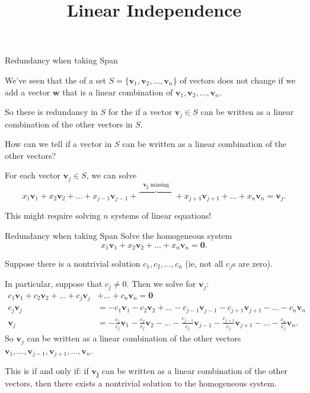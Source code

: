 \documentclass[xcolor=dvipsnames,aspectratio=169,t]{beamer}
\title{Linear Independence}
\begin{document}
\maketitle

\begin{frame}{Redundancy when taking Span}

  We've seen that the  of a set $S=\{\mathbf{v}_1,\mathbf{v}_2,\dots,\mathbf{v}_n\}$ of vectors does not change if we add a vector $\mathbf{w}$ that is a linear combination of $\mathbf{v}_1,\mathbf{v}_2,\dots,\mathbf{v}_n$.
  \bigskip
  
  So there is redundancy in $S$ for the  if a vector $\mathbf{v}_j\in S$ can be written as a linear combination of the other vectors in $S$.
  \bigskip
  
  How can we tell if a vector in $S$ can be written as a linear combination of the other vectors?
  \bigskip
  \pause
  
  For \alert{each} vector $\mathbf{v}_j\in S$, we can solve
  \[
    x_1 \mathbf{v}_1 + x_2 \mathbf{v}_2 + \dots 
    + x_{j-1} \mathbf{v}_{j-1}
    + \overbrace{\phantom{x_{j-1} \mathbf{v}_{j-1}}}^{\text{$\mathbf{v_j}$ missing}}
    + x_{j+1} \mathbf{v}_{j+1} + \dots +x_n \mathbf{v}_n = \mathbf{v}_j.
  \]
  \pause
  
  \hfill This might require solving \alert{$n$ systems} of linear equations!
  
\end{frame}
  
\begin{frame}{Redundancy when taking Span}
  \textbf{}
  Solve the homogeneous system
  \[
    x_1 \mathbf{v}_1 + x_2 \mathbf{v}_2 + \dots 
    +x_n \mathbf{v}_n = \mathbf{0}.
  \]
  \pause
  
  \vspace*{-1em}
  Suppose there is a \alert{nontrivial} solution $c_1,c_2,\dots,c_n$ (ie, \alert{not all} $c_j$s are zero).
  
  In particular, suppose that $c_j\ne 0$.  Then we solve for $\mathbf{v}_j$:
  \begin{align*}
    c_1 \mathbf{v}_1 + c_2 \mathbf{v}_2 + \dots + c_j \mathbf{v}_j &+ \dots + c_n \mathbf{v}_n = \mathbf{0} \\[.5em]
    c_j \mathbf{v}_j &= - c_1 \mathbf{v}_1 - c_2 \mathbf{v}_2 + \dots - c_{j-1} \mathbf{v}_{j-1} - c_{j+1} \mathbf{v}_{j+1}  - \dots - c_n \mathbf{v}_n \\[.5em]
    \mathbf{v}_j &= -\frac{c_1}{c_j} \mathbf{v}_1 - \frac{c_2}{c_j} \mathbf{v}_2 - \dots - \frac{c_{j-1}}{c_j} \mathbf{v}_{j-1} - \frac{c_{j+1}}{c_j} \mathbf{v}_{j+1}  - \dots - \frac{c_n}{c_j} \mathbf{v}_n.
  \end{align*}
  \pause
  So $\mathbf{v}_j$ can be written as a \alert{linear combination} of the other vectors $\mathbf{v}_1,\dots,\mathbf{v}_{j-1},\mathbf{v}_{j+1},\dots,\mathbf{v}_n$.
  \smallskip
  
  \pause
  This is \alert{if and only if}: if $\mathbf{v_j}$ can be written as a linear combination of the other vectors, then there exists a nontrivial solution to the homogeneous system.
\end{frame}
\end{document}
